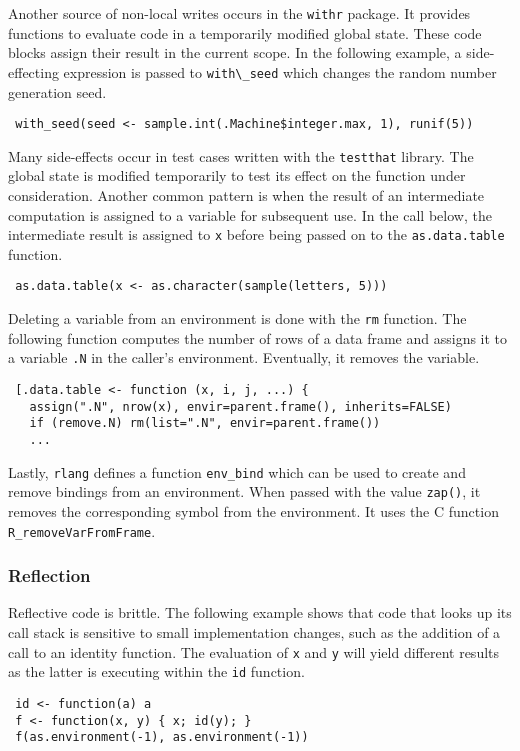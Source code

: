 \documentclass[review,creen,acmsmall]{acmart}
\renewcommand{\c}[1]{\lstinline |#1|\xspace}
\begin{document}
Another source of non-local writes occurs in the \c{withr} package. It
provides functions to evaluate code in a temporarily modified global state. These
code blocks assign their result in the current scope. In the following example, a
side-effecting expression is passed to \c{with\_seed} which changes the
random number generation seed.
%
\begin{lstlisting}
 with_seed(seed <- sample.int(.Machine$integer.max, 1), runif(5))
\end{lstlisting}
%

Many side-effects occur in test cases written with the \c{testthat} library.
The global state is modified temporarily to test its effect on the function
under consideration.
%
Another common pattern is when the result of an intermediate computation is
assigned to a variable for subsequent use. In the call below, the intermediate
result is assigned to \c{x} before being passed on to the
\c{as.data.table} function.
%
\begin{lstlisting}
 as.data.table(x <- as.character(sample(letters, 5)))
\end{lstlisting}
%

Deleting a variable from an environment is done with the \c{rm} function.
The following function computes the number of rows of a data frame and assigns
it to a variable \c{.N} in the caller's environment. Eventually, it removes the
variable.
%
\begin{lstlisting}
 [.data.table <- function (x, i, j, ...) {
   assign(".N", nrow(x), envir=parent.frame(), inherits=FALSE)
   if (remove.N) rm(list=".N", envir=parent.frame())
   ...
\end{lstlisting}

Lastly, \c{rlang} defines a function \c{env_bind} which can be used to
create and remove bindings from an environment. When passed with the value
\c{zap()}, it removes the corresponding symbol from the environment. It uses
the C function \c{R_removeVarFromFrame}.

\subsubsection{Reflection}
Reflective code is brittle. The following example shows that code that looks up
its call stack is sensitive to small implementation changes, such as the
addition of a call to an identity function. The evaluation of \c x and \c y will
yield different results as the latter is executing within the \c{id} function.
%
\begin{lstlisting}
 id <- function(a) a
 f <- function(x, y) { x; id(y); }
 f(as.environment(-1), as.environment(-1))
\end{lstlisting}
%
\end{document}
